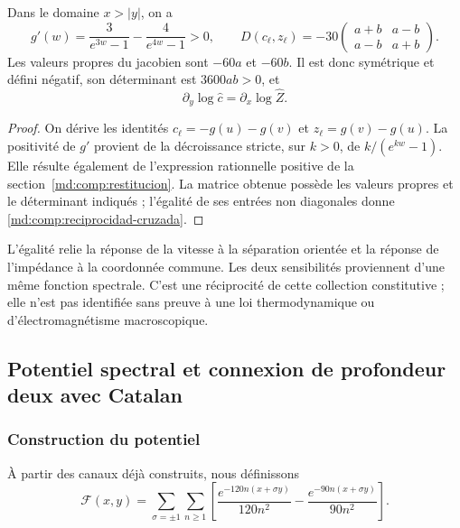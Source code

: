 \begin{proposition}
\label{md:comp:prop-reciprocidad}
Dans le domaine \(x>|y|\), on a
\begin{equation}
 g'(w)=\frac{3}{e^{3w}-1}-\frac{4}{e^{4w}-1}>0,
 \qquad
 D(c_\ell,z_\ell)=-30
 \begin{pmatrix}a+b&a-b\\a-b&a+b\end{pmatrix}.
 \label{md:comp:jacobiano}
\end{equation}
Les valeurs propres du jacobien sont \(-60a\) et \(-60b\). Il est donc
symétrique et défini négatif, son déterminant est \(3600ab>0\), et
\begin{equation}
 \boxed{\partial_y\log\widehat c=\partial_x\log\widehat Z.}
 \label{md:comp:reciprocidad-cruzada}
\end{equation}
\end{proposition}
\begin{proof}
On dérive les identités
\(c_\ell=-g(u)-g(v)\) et \(z_\ell=g(v)-g(u)\).
La positivité de \(g'\) provient de la décroissance stricte, sur \(k>0\),
de \(k/(e^{kw}-1)\). Elle résulte également de l’expression rationnelle positive
de la section~\ref{md:comp:restitucion}. La matrice obtenue possède les
valeurs propres et le déterminant indiqués ; l’égalité de ses entrées
non diagonales donne \eqref{md:comp:reciprocidad-cruzada}.
\end{proof}

L’égalité relie la réponse de la vitesse à la séparation
orientée et la réponse de l’impédance à la coordonnée commune.
Les deux sensibilités proviennent d’une même fonction spectrale. C’est une
réciprocité de cette collection constitutive ; elle n’est pas identifiée sans preuve
à une loi thermodynamique ou d’électromagnétisme macroscopique.

\subsection{Potentiel spectral et connexion de profondeur deux avec Catalan}
\label{md:comp:potencial}

\subsubsection{Construction du potentiel}
\label{md:comp:construccion-potencial}

À partir des canaux déjà construits, nous définissons
\begin{equation}
 \mathscr F(x,y)=\sum_{\sigma=\pm1}\sum_{n\geq1}
 \left[
 \frac{e^{-120n(x+\sigma y)}}{120n^2}
 -\frac{e^{-90n(x+\sigma y)}}{90n^2}
 \right].
 \label{md:comp:serie-potencial}
\end{equation}


